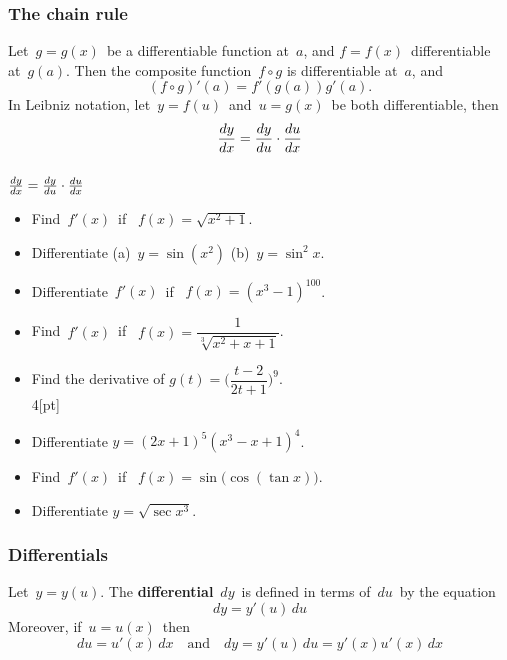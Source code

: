  \begin{frame}[fragile] \frametitle{The chain rule}
Let\ $g=g(x)$\ be a differentiable function at\ $a$, and $f=f(x)$\ differentiable at\ $g(a)$. Then the composite function\ $f\circ g$ is differentiable at\ $a$, and
{\[ (f\circ g)'(a) = f'(g(a)) g'(a) .\]}
In Leibniz notation, let\ $y=f(u)$\ and\ $u=g(x)$\ be both differentiable, then
{\[\frac{d {y} }{d x} = \frac{d y}{d u} \cdot \frac{d {u} }{d x} \]}
\end{frame}

 \begin{frame}[fragile] \frametitle{}

$\frac{d {y} }{d x} = \frac{d y}{d u} \cdot \frac{d {u} }{d x} $

\begin{itemize}
	\item Find\ $f'(x)$\ if \ $f(x)=\sqrt{x^2+1}$. \\
	\item Differentiate\; (a)\ $y=\sin (x^2)$ \quad  (b)\ $y=\sin^2 x$.
	\item Differentiate\ $f'(x)$\ if \ $f(x)=(x^3-1)^{100}$. \\
	\item Find\  $f'(x)$\ if \ $f(x)=\dfrac{1}{\sqrt[3]{x^2+x+1}}$. 
\end{itemize}


\begin{itemize}
	\item Find the derivative of\; $g(t)= \big( \dfrac{t-2}{2t+1} \big)^9$.\\4[pt]
	\item Differentiate\; $y=(2x+1)^5(x^3-x+1)^4$. \\
	\item Find\  $f'(x)$\ if \ $f(x)=\sin \big( \cos ( \tan x ) \big)$. 
	\item Differentiate\; $y=\sqrt{\sec x^3}$.	
\end{itemize}


\end{frame}

 \begin{frame}[fragile] \frametitle{Differentials}

Let\ $y=y(u)$. The {\bf differential}\ $d {y}$\ is defined in terms of\ $d u$\ by the equation
{\[d y = y'(u)\, d u\]}
Moreover, if\ $u=u(x)$\ then
{ \[ d u = u'(x)\, d x \quad \text{and} \quad d y = y'(u)\, d u = y'(x) u'(x)\, d x \]}
\end{frame}

